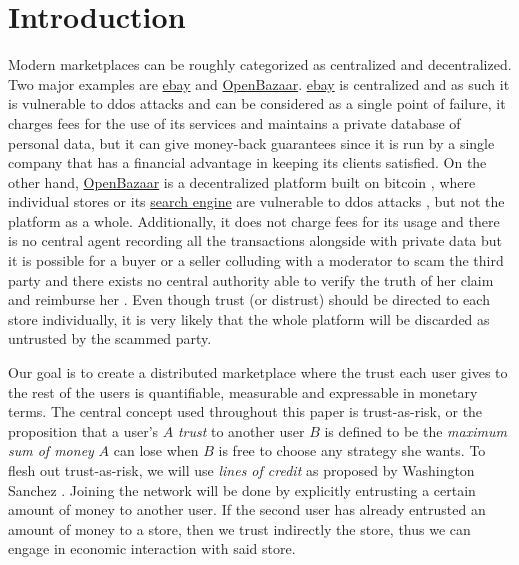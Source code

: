 \documentclass[11pt]{llncs}
\begin{document}
  \section{Introduction}
     Modern marketplaces can be roughly categorized as centralized and decentralized. Two major examples are
     \href{http://www.ebay.com}{ebay} and \href{https://openbazaar.org/}{OpenBazaar}. \href{http://www.ebay.com}{ebay} is
     centralized and as such it is vulnerable to ddos attacks \cite{ddosattacks} and can be considered as a single point of
     failure, it charges fees for the use of its services \cite{ebayfees} and maintains a private database of personal data,
     but it can give money-back guarantees \cite{ebayguarantee} since it is run by a single company that has a financial
     advantage in keeping its clients satisfied. On the other hand, \href{https://openbazaar.org/}{OpenBazaar} is a
     decentralized platform built on bitcoin \cite{bitcoin}, where individual stores or its \href{https://duosear.ch}{search
     engine} are vulnerable to ddos attacks \cite{ddosattacks}, but not the platform as a whole. Additionally, it does not
     charge fees for its usage \cite{openbazaar} and there is no central agent recording all the transactions alongside with
     private data \cite{openbazaar} but it is possible for a buyer or a seller colluding with a  moderator to scam the third
     party and there exists no central authority able to verify the truth of her claim and reimburse her
     \cite{multisigfraud}. Even though trust (or distrust) should be directed to each store individually, it is very likely
     that the whole platform will be discarded as untrusted by the scammed party.

     Our goal is to create a distributed marketplace where the trust each user gives to the rest of the users is
     quantifiable, measurable and expressable in monetary terms. The central concept used throughout this paper is
     trust-as-risk, or the proposition that a user's $A$ \textit{trust} to another user $B$ is defined to be the
     \textit{maximum sum of money} $A$ can lose when $B$ is free to choose any strategy she wants. To flesh out
     trust-as-risk, we will use \textit{lines of credit} as proposed by Washington Sanchez \cite{loc}. Joining the network
     will be done by explicitly entrusting a certain amount of money to another user. If the second user has already
     entrusted an amount of money to a store, then we trust indirectly the store, thus we can engage in economic interaction
     with said store.
\end{document}

